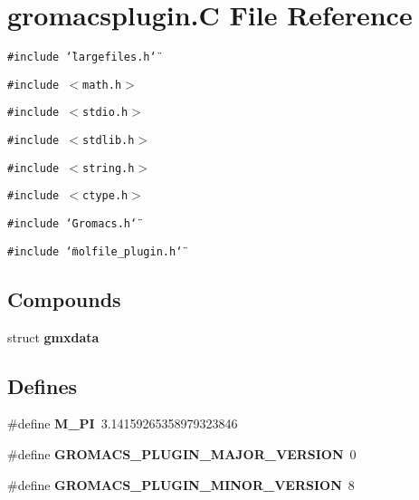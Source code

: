 \section{gromacsplugin.C File Reference}
\label{gromacsplugin_8C}
{\tt \#include \char`\"{}largefiles.h\char`\"{}}\par
{\tt \#include $<$math.h$>$}\par
{\tt \#include $<$stdio.h$>$}\par
{\tt \#include $<$stdlib.h$>$}\par
{\tt \#include $<$string.h$>$}\par
{\tt \#include $<$ctype.h$>$}\par
{\tt \#include \char`\"{}Gromacs.h\char`\"{}}\par
{\tt \#include \char`\"{}molfile\_\-plugin.h\char`\"{}}\par
\subsection*{Compounds}
\begin{CompactItemize}
\item 
struct {\bf gmxdata}
\end{CompactItemize}
\subsection*{Defines}
\begin{CompactItemize}
\item 
\#define {\bf M\_\-PI}\ 3.14159265358979323846
\item 
\#define {\bf GROMACS\_\-PLUGIN\_\-MAJOR\_\-VERSION}\ 0
\item 
\#define {\bf GROMACS\_\-PLUGIN\_\-MINOR\_\-VERSION}\ 8
\end{CompactItemize}
